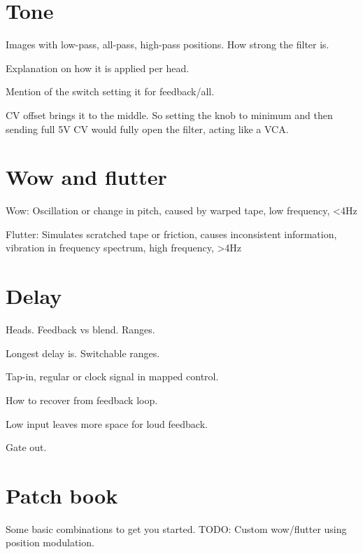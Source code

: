 \documentclass[11pt]{article}
\begin{document}
\begin{minipage}{0.05\textwidth}
\phantom{ }
\end{minipage}%
\begin{minipage}[t]{0.45\textwidth}
\setlength{\parskip}{6pt}

\section{Tone}

Images with low-pass, all-pass, high-pass positions. How strong the filter is.

Explanation on how it is applied per head.

Mention of the switch setting it for feedback/all.

CV offset brings it to the middle. So setting the knob to minimum and then sending
full 5V CV would fully open the filter, acting like a VCA.

\section{Wow and flutter}

Wow: Oscillation or change in pitch, caused by warped tape, low frequency, <4Hz

Flutter: Simulates scratched tape or friction, causes inconsistent information, vibration in frequency spectrum, high frequency, >4Hz

\section{Delay}

Heads. Feedback vs blend. Ranges.

Longest delay is. Switchable ranges.

Tap-in, regular or clock signal in mapped control.

How to recover from feedback loop.

Low input leaves more space for loud feedback.

Gate out.

\end{minipage}

\newpage
\section{Patch book}

Some basic combinations to get you started. TODO: Custom wow/flutter using position modulation.
\end{document}
